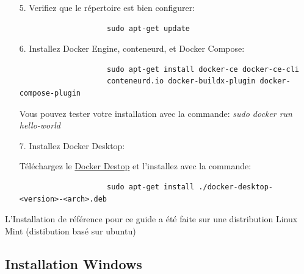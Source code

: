\documentclass[internal]{nhitec_design}
\begin{document}
\begin{itemize}
            \item[5.] Verifiez que le répertoire est bien configurer:

                \begin{lstlisting}
                    sudo apt-get update
                \end{lstlisting}    

            \item[6.] Installez Docker Engine, conteneurd, et Docker Compose:

                \begin{lstlisting}
                    sudo apt-get install docker-ce docker-ce-cli 
                    conteneurd.io docker-buildx-plugin docker-compose-plugin
                \end{lstlisting}
                \begin{footnotesize}
                    Vous pouvez tester votre installation avec la commande: \textit{sudo docker run hello-world}
                \end{footnotesize}

                \bigskip
            \item[7.] Installez Docker Desktop:

            
                \begin{footnotesize}
                    Téléchargez le \href{https://desktop.docker.com/linux/main/amd64/docker-desktop-4.17.0-amd64.deb?utm_source=docker&utm_medium=webreferral&utm_campaign=docs-driven-download-linux-amd64}{Docker Destop} et l'installez avec la commande:
                \end{footnotesize}

                \begin{lstlisting}
                    sudo apt-get install ./docker-desktop-<version>-<arch>.deb
                \end{lstlisting}

        \end{itemize}

\bigskip

        \begin{footnotesize}
            L'Installation de référence pour ce guide a été faite sur une distribution Linux Mint (distibution basé sur ubuntu)\\
        \end{footnotesize}

\newpage

    \subsection{Installation Windows}
\end{document}
